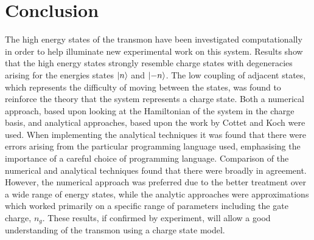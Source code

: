 \documentclass[11pt]{article}
\begin{document}
\section{Conclusion}
The high energy states of the transmon have been investigated computationally in order to help illuminate new experimental work on this system. Results show that the high energy states strongly resemble charge states with degeneracies arising for the energies states $\ket{n}$ and $\ket{-n}$. The low coupling of adjacent states, which represents the difficulty of moving between the states, was found to reinforce the theory that the system represents a charge state. Both a numerical approach, based upon looking at the Hamiltonian of the system in the charge basis, and analytical approaches, based upon the work by Cottet \cite{cottetImplementationQuantumBit2002} and Koch \cite{kochChargeinsensitiveQubitDesign2007} were used. When implementing the analytical techniques it was found that there were errors arising from the particular programming language used, emphasising the importance of a careful choice of programming language. Comparison of the numerical and analytical techniques found that there were broadly in agreement. However, the numerical approach was preferred due to the better treatment over a wide range of energy states, while the analytic approaches were approximations which worked primarily on a specific range of parameters including the gate charge, $n_g$. These results, if confirmed by experiment, will allow a good understanding of the transmon using a charge state model.




\appendix
\end{document}
